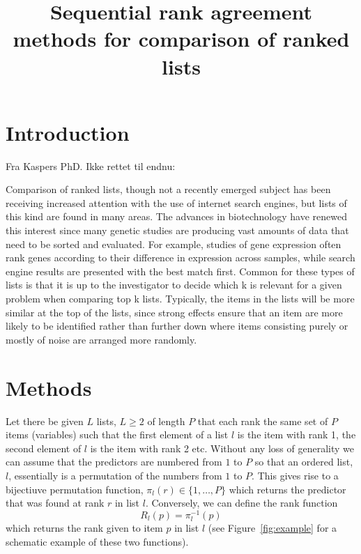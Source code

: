 \documentclass[12pt,a4paper]{article}\usepackage[]{graphicx}\usepackage[]{color}
\begin{document}

\title{Sequential rank agreement methods for comparison of ranked lists}
\author{}

\maketitle

\begin{abstract}

\end{abstract}

\section{Introduction}

Fra Kaspers PhD. Ikke rettet til endnu:

Comparison of ranked lists, though not a recently emerged subject has been receiving increased attention with the use of internet search engines, but lists of this kind are found in many areas. The advances in biotechnology have renewed this interest since many genetic studies are producing vast amounts of data that need to be sorted and evaluated. For example, studies of gene expression often rank genes according to their difference in expression across samples, while search engine results are presented with the best match first. Common for these types of lists is that it is up to the investigator to decide which k is relevant for a given problem when comparing top k lists. Typically, the items in the lists will be more similar at the top of the lists, since strong effects ensure that an item are more likely to be identified rather than further down where items consisting purely or mostly of noise are arranged more randomly.

\section{Methods}
Let there be given $L$ lists, $L\geq2$ of length $P$ that each rank the same set of $P$ items (variables) such that the first element of a list $l$ is the item with rank 1, the second element of $l$ is the item with rank 2 etc. Without any loss of generality we can assume that the predictors are numbered from $1$ to $P$ so that an ordered list, $l$, essentially is a permutation of the numbers from $1$ to $P$. This gives rise to a bijectiuve permutation function, $\pi_l(r) \in \{1, \ldots, P\}$ which returns the predictor that was found at rank $r$ in list $l$.
Conversely, we can define the rank function
\begin{equation}
R_l(p) = \pi_l^{-1}(p)
\end{equation}
which returns the rank given to item $p$ in list $l$ (see Figure~\ref{fig:example} for a schematic example of these two functions).
\end{document}
